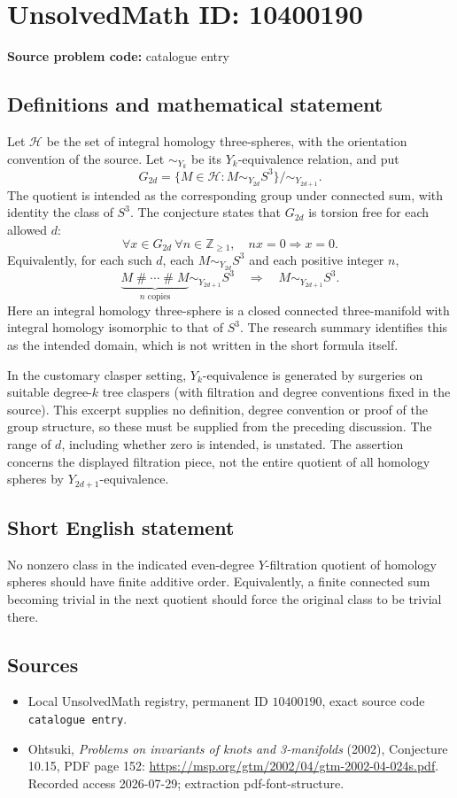 \documentclass[11pt]{article}
\newcommand{\Z}{\mathbb{Z}}
\begin{document}
\section*{UnsolvedMath ID: 10400190}
\textbf{Source problem code:} catalogue entry
\subsection{Definitions and mathematical statement}
Let \(\mathcal H\) be the set of integral homology three-spheres, with the orientation convention of the source. Let \(\sim_{Y_k}\) be its \(Y_k\)-equivalence relation, and put
\[G_{2d}=\{M\in\mathcal H:M\sim_{Y_{2d}}S^3\}/\!\sim_{Y_{2d+1}}.\]
The quotient is intended as the corresponding group under connected sum, with identity the class of \(S^3\). The conjecture states that \(G_{2d}\) is torsion free for each allowed \(d\):
\[\forall x\in G_{2d}\ \forall n\in\Z_{\geq1},\quad nx=0\Longrightarrow x=0.\]
Equivalently, for each such \(d\), each \(M\sim_{Y_{2d}}S^3\) and each positive integer \(n\),
\[\underbrace{M\mathbin{\#}\cdots\mathbin{\#}M}_{n\text{ copies}}
\sim_{Y_{2d+1}}S^3
\quad\Longrightarrow\quad M\sim_{Y_{2d+1}}S^3.\]
Here an integral homology three-sphere is a closed connected three-manifold with integral homology isomorphic to that of \(S^3\). The research summary identifies this as the intended domain, which is not written in the short formula itself.

In the customary clasper setting, \(Y_k\)-equivalence is generated by surgeries on suitable degree-\(k\) tree claspers (with filtration and degree conventions fixed in the source). This excerpt supplies no definition, degree convention or proof of the group structure, so these must be supplied from the preceding discussion. The range of \(d\), including whether zero is intended, is unstated. The assertion concerns the displayed filtration piece, not the entire quotient of all homology spheres by \(Y_{2d+1}\)-equivalence.
\subsection{Short English statement}
No nonzero class in the indicated even-degree \(Y\)-filtration quotient of homology spheres should have finite additive order. Equivalently, a finite connected sum becoming trivial in the next quotient should force the original class to be trivial there.
\subsection{Sources}
\begin{itemize}
\item Local UnsolvedMath registry, permanent ID \(10400190\), exact source code \texttt{catalogue entry}.
\item Ohtsuki, \emph{Problems on invariants of knots and 3-manifolds} (2002), Conjecture 10.15, PDF page 152: \url{https://msp.org/gtm/2002/04/gtm-2002-04-024s.pdf}. Recorded access 2026-07-29; extraction pdf-font-structure.
\end{itemize}
\end{document}
